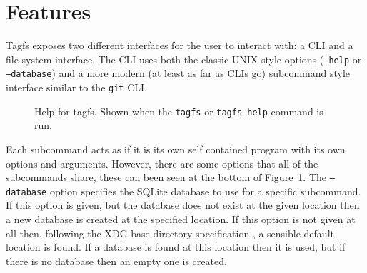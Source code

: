 \section{Features}
\label{section:features}

Tagfs exposes two different interfaces for the user to interact with: a CLI and
a file system interface. The CLI uses both the classic UNIX style options
(\texttt{--help} or \texttt{--database}) and a more modern (at least as far as
CLIs go) subcommand style interface similar to the \texttt{git} CLI.

\begin{figure}[h]
    \centering
    \caption[Help for \texttt{tagfs} CLI]{Help for tagfs. Shown when the
        \texttt{tagfs} or \texttt{tagfs help} command is run.}
    \label{fig:root-cli}
\end{figure}

Each subcommand acts as if it is its own self contained program with its own
options and arguments. However, there are some options that all of the
subcommands share, these can been seen at the bottom of
Figure~\ref{fig:root-cli}. The \texttt{--database} option specifies the SQLite
database to use for a specific subcommand. If this option is given, but the
database does not exist at the given location then a new database is created at
the specified location. If this option is not given at all then, following the
XDG base directory specification \cite{xdg-base-dir-spec}, a sensible default
location is found. If a database is found at this location then it is used, but
if there is no database then an empty one is created.

